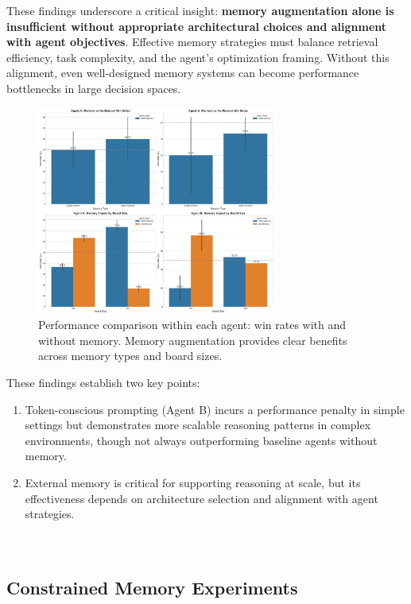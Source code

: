 \documentclass[10pt]{article}
\begin{document}
These findings underscore a critical insight: \textbf{memory augmentation alone is insufficient without appropriate architectural choices and alignment with agent objectives}. Effective memory strategies must balance retrieval efficiency, task complexity, and the agent's optimization framing. Without this alignment, even well-designed memory systems can become performance bottlenecks in large decision spaces.

\begin{figure}[H]
\centering
\includegraphics[width=0.7\textwidth]{figures/memory_baseline/memory_baseline_comparison.png}
\caption{Performance comparison within each agent: win rates with and without memory. Memory augmentation provides clear benefits across memory types and board sizes.}
\label{fig:memory_baseline_comparison}
\end{figure}

These findings establish two key points: 
\begin{enumerate}[leftmargin=*,nosep]
    \item Token-conscious prompting (Agent B) incurs a performance penalty in simple settings but demonstrates more scalable reasoning patterns in complex environments, though not always outperforming baseline agents without memory.
    \item External memory is critical for supporting reasoning at scale, but its effectiveness depends on architecture selection and alignment with agent strategies. \\\\\\
\end{enumerate}

\subsection{Constrained Memory Experiments}
\end{document}
